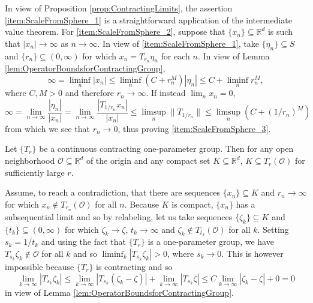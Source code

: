 \documentclass[smallextended]{svjour3}
\theoremstyle{remark}
\renewenvironment{proof}[1][\proofname]{\renewcommand\xproofname{#1}\xproof}{\endxproof}
\begin{document}
\begin{proof}
In view of Proposition \ref{prop:ContractingLimits}, the assertion \ref{item:ScaleFromSphere_1} is a straightforward application of the intermediate value theorem. For \ref{item:ScaleFromSphere_2}, suppose that $\{x_n\}\subseteq\mathbb{R}^d$ is such that $|x_n|\rightarrow \infty$ as $n\rightarrow\infty$. In view of \ref{item:ScaleFromSphere_1}, take $\{\eta_n\}\subseteq S$ and $\{r_n\}\subseteq (0,\infty)$ for which $x_n=T_{r_n}\eta_n$ for each $n$. In view of Lemma \ref{lem:OperatorBoundsforContractingGroup},
\begin{equation*}
\infty=\liminf_n |x_n|\leq\liminf_n \left(C+r_n^M\right)|\eta_n|\leq C+\liminf_n r_n^M,
\end{equation*}
where $C,M>0$ and therefore $r_n\rightarrow\infty$. If instead $\lim_n x_n=0$,
\begin{equation*}
\infty=\lim_{n\rightarrow\infty}\frac{|\eta_n|}{|x_n|}=\lim_{n\rightarrow\infty}\frac{|T_{1/r_n}x_n|}{|x_n|}\leq\limsup_n\|T_{1/r_n}\|\leq\limsup_n(C+(1/r_n)^M)
\end{equation*}
from which we see that $r_n\rightarrow 0$, thus proving \ref{item:ScaleFromSphere_3}.
\end{proof}


\begin{proposition}\label{prop:ContractingCapturesCompact}
Let $\{T_r\}$ be a continuous contracting one-parameter group. Then for any open neighborhood $\mathcal{O}\subseteq\mathbb{R}^d$ of the origin and any compact set $K\subseteq\mathbb{R}^d$, $K\subseteq T_r(\mathcal{O})$ for sufficiently large $r$.
\end{proposition}
\begin{proof}
Assume, to reach a contradiction, that there are sequences $\{x_n\}\subseteq K$ and $r_n\rightarrow\infty$ for which $x_n\notin T_{r_n}(\mathcal{O})$ for all $n$. Because $K$ is compact, $\{x_n\}$ has a subsequential limit and so by relabeling, let us take sequences $\{\zeta_k\}\subseteq K$ and $\{t_k\}\subseteq (0,\infty)$ for which $\zeta_k\rightarrow \zeta$, $t_k\rightarrow\infty$ and $\zeta_k\notin T_{t_k}(\mathcal{O})$ for all $k$. Setting $s_k=1/t_k$ and using the fact that $\{T_r\}$ is a one-parameter group, we have $T_{s_k}\zeta_k\notin\mathcal{O}$ for all $k$ and so $\liminf_{k}|T_{s_k}\zeta_k|>0$, where $s_k\rightarrow 0$. This is however impossible because $\{T_r\}$ is contracting and so
\begin{equation*}
\lim_{k\rightarrow\infty}|T_{s_k}\zeta_k|\leq\lim_{k\rightarrow \infty}|T_{s_k}(\zeta_k-\zeta)|+\lim_{k\rightarrow\infty}|T_{s_k}\zeta|\leq C\lim_{k\rightarrow\infty}|\zeta_k-\zeta|+0=0
\end{equation*}
in view of Lemma \ref{lem:OperatorBoundsforContractingGroup}.
\end{proof}
\end{document}
